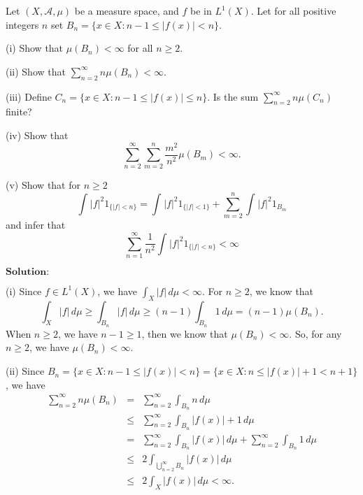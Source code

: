 \documentclass[12pt,a4paper]{ctexart}
\begin{document}
Let $(X, \mathcal{A}, \mu)$ be a measure space, and $f$ be in $L^{1}(X)$. Let for all positive integers $n$ set $B_{n} = \{x \in X: n-1 \leq |f(x)| < n \}$.

(i) Show that $\mu(B_{n}) < \infty$ for all $n \geq 2$.

(ii) Show that $\sum_{n=2}^{\infty} n \mu(B_{n}) < \infty$.

(iii) Define $C_{n} = \{x \in X : n-1 \leq |f(x)| \leq n \}$. Is the sum $\sum_{n=2}^{\infty} n \mu(C_{n})$ finite?

(iv) Show that $$\sum_{n=2}^{\infty} \sum_{m=2}^{n} \frac{m^{2}}{n^{2}} \mu(B_{m}) < \infty.$$

(v) Show that for $n \geq 2$
\begin{equation*}
    \int_{}^{} |f|^{2} 1_{\{|f| < n\}} = \int_{}^{} |f|^{2} 1_{\{|f| < 1\}} + \sum_{m=2}^{n} \int_{}^{} |f|^{2} 1_{B_{m}}
\end{equation*}
and infer that
\begin{equation*}
    \sum_{n=1}^{\infty} \frac{1}{n^{2}} \int_{}^{} |f|^{2} 1_{\{|f| < n\}} < \infty 
\end{equation*}
 
 
 
\vspace{8pt}
$\textbf{Solution:}$

(i) Since $f \in L^{1}(X)$, we have $\int_{X}^{} |f| \, d \mu < \infty$. For $n \geq 2$, we know that
\begin{equation*}
    \int_{X}^{} |f| \, d \mu \geq \int_{B_{n}}^{} |f| \, d \mu \geq (n-1) \int_{B_{n}}^{} 1 \, d \mu = (n-1) \mu(B_{n}).
\end{equation*}
When $n \geq 2$, we have $n-1 \geq 1$, then we know that $\mu(B_{n}) < \infty$.  So, for any $n \geq 2$, we have $\mu(B_{n}) < \infty$.

(ii) Since $B_{n} = \{ x \in X: n-1 \leq |f(x)| < n \} = \{x \in X: n \leq |f(x)|+1 < n+1 \}$, we have
\begin{eqnarray*}
    \sum_{n=2}^{\infty} n \mu(B_{n}) & = & \sum_{n=2}^{\infty} \int_{B_{n}}^{} n \, d \mu \\
& \leq & \sum_{n=2}^{\infty}  \int_{B_{n}}^{} |f(x)| + 1 \, d \mu \\
& = & \sum_{n=2}^{\infty}  \int_{B_{n}}^{} |f(x)| \, d \mu + \sum_{n=2}^{\infty}  \int_{B_{n}}^{} 1 \, d \mu \\ 
& \leq & 2 \int_{\bigcup_{n=2}^{\infty} B_{n}}^{} |f(x)| \, d \mu \\
& \leq & 2 \int_{X}^{} |f(x)| \, d \mu < \infty.
\end{eqnarray*}
\end{document}

